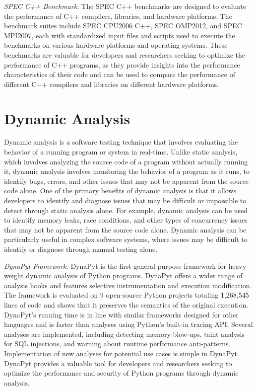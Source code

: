 \textit{SPEC C++ Benchmark.} The SPEC C++ benchmarks are designed to evaluate the performance of C++ compilers, libraries, and hardware platforms. The benchmark suites include SPEC CPU2006 C++, SPEC OMP2012, and SPEC MPI2007, each with standardized input files and scripts used to execute the benchmarks on various hardware platforms and operating systems. These benchmarks are valuable for developers and researchers seeking to optimize the performance of C++ programs, as they provide insights into the performance characteristics of their code and can be used to compare the performance of different C++ compilers and libraries on different hardware platforms. \cite{SPEC_C++_2006, SPEC_OMP_2012, SPEC_MPI_2007}

\section{Dynamic Analysis}
Dynamic analysis is a software testing technique that involves evaluating the behavior of a running program or system in real-time.
Unlike static analysis, which involves analyzing the source code of a program without actually running it, dynamic analysis involves monitoring the behavior of a program as it runs, to identify bugs, errors, and other issues that may not be apparent from the source code alone.
One of the primary benefits of dynamic analysis is that it allows developers to identify and diagnose issues that may be difficult or impossible to detect through static analysis alone.
For example, dynamic analysis can be used to identify memory leaks, race conditions, and other types of concurrency issues that may not be apparent from the source code alone.
Dynamic analysis can be particularly useful in complex software systems, where issues may be difficult to identify or diagnose through manual testing alone.
\cite{dynamic_analysis}

\textit{DynaPyt Framework.} DynaPyt is the first general-purpose framework for heavy-weight dynamic analysis of Python programs. DynaPyt offers a wider range of analysis hooks and features selective instrumentation and execution modification. The framework is evaluated on 9 open-source Python projects totaling 1,268,545 lines of code and shows that it preserves the semantics of the original execution. DynaPyt's running time is in line with similar frameworks designed for other languages and is faster than analyses using Python's built-in tracing API. Several analyses are implemented, including detecting memory blow-ups, taint analysis for SQL injections, and warning about runtime performance anti-patterns. Implementation of new analyses for potential use cases is simple in DynaPyt. DynaPyt provides a valuable tool for developers and researchers seeking to optimize the performance and security of Python programs through dynamic analysis. \cite{DynaPyt2022}

